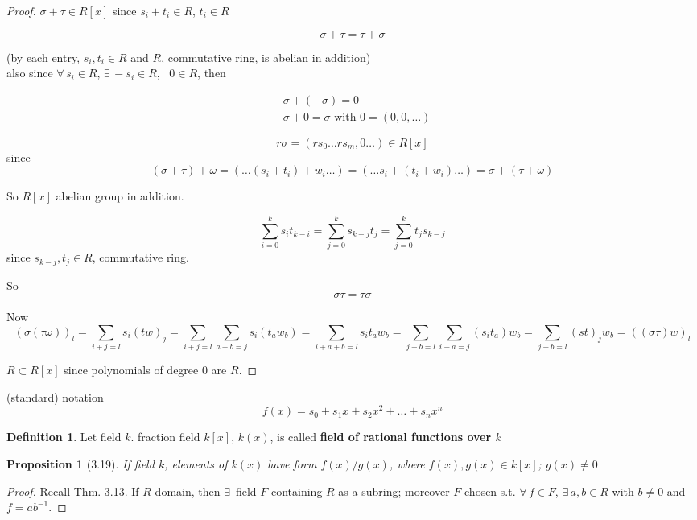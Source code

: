 \documentclass[twoside,landscape]{amsart}
\theoremstyle{plain}
\newtheorem{proposition}{Proposition}
\theoremstyle{definition}
\newtheorem{definition}{Definition}
\theoremstyle{remark}
\begin{document}
\begin{multicols*}{2}
\begin{proof}
$\sigma + \tau \in R[x]$ since $s_i + t_i \in R$, $t_i \in R$

\[
\sigma + \tau = \tau + \sigma
\]

(by each entry, $s_i, t_i \in R$ and $R$, commutative ring, is abelian in addition) \\

also since $\forall \, s_i \in R$, $\exists \, -s_i \in R$, \, $0 \in R$, then 

\[
\begin{aligned}
  & \sigma + (- \sigma) = 0 \\ 
  &  \sigma + 0 = \sigma \text{ with } 0 = (0,0, \dots )
\end{aligned}
\]

\[
r\sigma = (rs_0 \dots rs_m , 0 \dots ) \in R[x]  
\]
since 
\[
(\sigma + \tau ) + \omega = ( \dots (s_i + t_i ) + w_i \dots ) = ( \dots s_i + (t_i + w_i ) \dots ) = \sigma + (\tau + \omega )
\]

So $R[x]$ abelian group in addition.

\[
\sum_{i=0}^k s_i t_{k-i} = \sum_{j=0}^k s_{k-j} t_j = \sum_{j=0}^k t_j s_{k-j} 
\]
since $s_{k-j}, t_j \in R$, commutative ring.  

So
\[
\sigma \tau = \tau \sigma
\]

Now
\[
(\sigma (\tau \omega) )_l = \sum_{i+j = l } s_i (tw)_j = \sum_{i+j = l } \sum_{a+b= j} s_i (t_a w_b) = \sum_{ i + a+ b = l } s_i t_a w_b = \sum_{ j +b = l } \sum_{i + a =j } (s_it_a) w_b = \sum_{j+b =l } (st)_j w_b = ((\sigma \tau)w)_l
\]

$R \subset R[x]$ since polynomials of degree $0$ are $R$.  


\end{proof}

(standard) notation
\[
f(x) = s_0 + s_1 x + s_2 x^2 + \dots + s_n x^n
\]

\begin{definition}
  Let field $k$.  fraction field $k[x]$, $k(x)$, is called \textbf{field of rational functions over $k$}
  \end{definition}

\begin{proposition}[3.19]
  If field $k$, elements of $k(x)$ have form $f(x)/g(x)$, where $f(x),g(x) \in k[x]$; $g(x) \neq 0$
  \end{proposition}

\begin{proof}
  Recall Thm. 3.13.  If $R$ domain, then $\exists \, $ field $F$ containing $R$ as a subring; moreover $F$ chosen s.t. $\forall \, f \in F$, $\exists \, a,b \in R$ with $b\neq 0$ and $f=ab^{-1}$.


\end{proof}
\end{multicols*}
\end{document}
